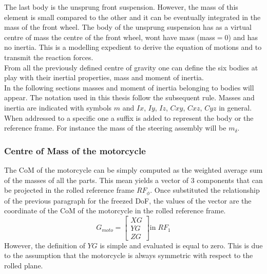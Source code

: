 %
The last body is the unsprung front suspension. However, the mass of this element is small compared to the other and it can be eventually integrated in the mass of the front wheel. The body of the unsprung suspension has as a virtual centre of mass the centre of the front wheel, wont have mass (mass$=0$) and has no inertia. This is a modelling expedient to derive the equation of motions and to transmit the reaction forces.\\
From all the previously defined centre of gravity one can define the six bodies at play with their inertial properties, mass and moment of inertia.\\
In the following sections masses and moment of inertia belonging to bodies will appear. The notation used in this thesis follow the subsequent rule. Masses and inertia are indicated with symbols $m$ and $Ix$, $Iy$, $Iz$, $Cxy$, $Cxz$, $Cyz$ in general. When addressed to a specific one a suffix is added to represent the body or the reference frame. For instance the mass of the steering assembly will be $m_\delta$.
%
\subsubsection{Centre of Mass of the motorcycle}
%
The CoM of the motorcycle can be simply computed as the weighted average sum of the masses of all the parts. This mean yields a vector of 3 components that can be projected in the rolled reference frame $RF_\phi$. Once substituted the relationship of the previous paragraph for the freezed DoF, the values of the vector are the coordinate of the CoM of the motorcycle in the rolled reference frame. 
\begin{equation}
    \label{eq:CoM}
    G_{moto} = 
    \left[ \begin{array}{c}
        XG\\
        YG\\
        ZG
    \end{array} \right]
    \text{in} \; RF_1
\end{equation}
However, the definition of $YG$ is simple and evaluated is equal to zero. This is due to the assumption that the motorcycle is always symmetric with respect to the rolled plane.
%
